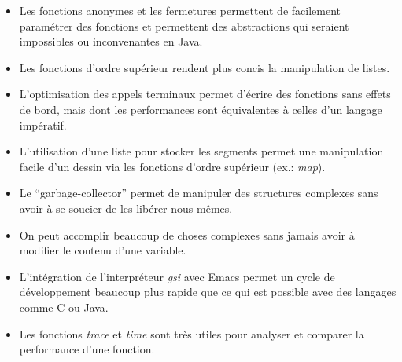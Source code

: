 \documentclass[10pt]{article}
\begin{document}
\begin{itemize}
\item Les fonctions anonymes et les fermetures permettent de
  facilement paramétrer des fonctions et permettent des abstractions
  qui seraient impossibles ou inconvenantes en Java.
\item Les fonctions d'ordre supérieur rendent plus concis la
  manipulation de listes.
\item L'optimisation des appels terminaux permet d'écrire des
  fonctions sans effets de bord, mais dont les performances sont
  équivalentes à celles d'un langage impératif.
\item L'utilisation d'une liste pour stocker les segments permet une
  manipulation facile d'un dessin via les fonctions d'ordre supérieur
  (ex.: \emph{map}).
\item Le ``garbage-collector'' permet de manipuler des structures
  complexes sans avoir à se soucier de les libérer nous-mêmes.
\item On peut accomplir beaucoup de choses complexes sans jamais avoir
  à modifier le contenu d'une variable.
\item L'intégration de l'interpréteur \emph{gsi} avec Emacs permet un
  cycle de développement beaucoup plus rapide que ce qui est possible
  avec des langages comme C ou Java.
\item Les fonctions \emph{trace} et \emph{time} sont très utiles pour
  analyser et comparer la performance d'une fonction.
\end{itemize}
\end{document}
